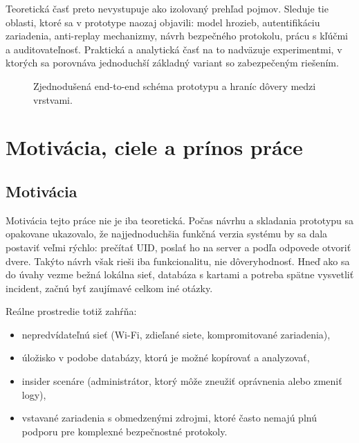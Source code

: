 \documentclass[journal,a4paper,onecolumn]{IEEEtran}
\begin{document}
Teoretická časť preto nevystupuje ako izolovaný prehľad pojmov. Sleduje tie oblasti, ktoré sa v prototype naozaj objavili: model hrozieb, autentifikáciu zariadenia, anti-replay mechanizmy, návrh bezpečného protokolu, prácu s kľúčmi a auditovateľnosť. Praktická a analytická časť na to nadväzuje experimentmi, v ktorých sa porovnáva jednoduchší základný variant so zabezpečeným riešením.


\begin{figure}[!ht]
\centering
{}
\caption{Zjednodušená end-to-end schéma prototypu a hraníc dôvery medzi vrstvami.}
\label{fig:e2e_overview}
\end{figure}

\section{Motivácia, ciele a prínos práce}

\subsection{Motivácia}

Motivácia tejto práce nie je iba teoretická. Počas návrhu a skladania prototypu sa opakovane ukazovalo, že najjednoduchšia funkčná verzia systému by sa dala postaviť veľmi rýchlo: prečítať UID, poslať ho na server a podľa odpovede otvoriť dvere. Takýto návrh však rieši iba funkcionalitu, nie dôveryhodnosť. Hneď ako sa do úvahy vezme bežná lokálna sieť, databáza s kartami a potreba spätne vysvetliť incident, začnú byť zaujímavé celkom iné otázky.

Reálne prostredie totiž zahŕňa:

\begin{itemize}[leftmargin=*,itemsep=2pt]
  \item nepredvídateľnú sieť (Wi-Fi, zdieľané siete, kompromitované zariadenia),
  \item úložisko v podobe databázy, ktorú je možné kopírovať a analyzovať,
  \item insider scenáre (administrátor, ktorý môže zneužiť oprávnenia alebo zmeniť logy),
  \item vstavané zariadenia s obmedzenými zdrojmi, ktoré často nemajú plnú podporu pre komplexné bezpečnostné protokoly.
\end{itemize}
\end{document}
